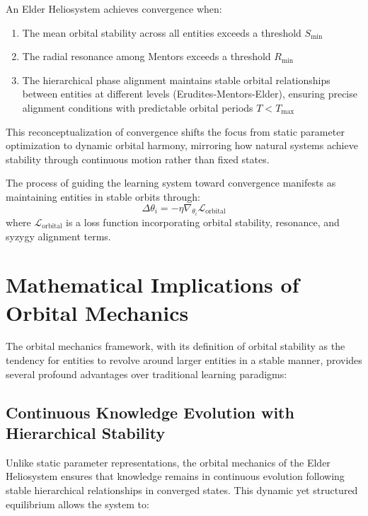 \begin{theorem}
An Elder Heliosystem achieves convergence when:
\begin{enumerate}
    \item The mean orbital stability across all entities exceeds a threshold $S_{\text{min}}$
    \item The radial resonance among Mentors exceeds a threshold $R_{\text{min}}$
    \item The hierarchical phase alignment maintains stable orbital relationships between entities at different levels (Erudites-Mentors-Elder), ensuring precise alignment conditions with predictable orbital periods $T < T_{\text{max}}$
\end{enumerate}
\end{theorem}

This reconceptualization of convergence shifts the focus from static parameter optimization to dynamic orbital harmony, mirroring how natural systems achieve stability through continuous motion rather than fixed states.

\begin{proposition}
The process of guiding the learning system toward convergence manifests as maintaining entities in stable orbits through:
\begin{equation}
\Delta\theta_i = -\eta \nabla_{\theta_i} \mathcal{L}_{\text{orbital}}
\end{equation}
where $\mathcal{L}_{\text{orbital}}$ is a loss function incorporating orbital stability, resonance, and syzygy alignment terms.
\end{proposition}

\section{Mathematical Implications of Orbital Mechanics}

The orbital mechanics framework, with its definition of orbital stability as the tendency for entities to revolve around larger entities in a stable manner, provides several profound advantages over traditional learning paradigms:

\subsection{Continuous Knowledge Evolution with Hierarchical Stability}

Unlike static parameter representations, the orbital mechanics of the Elder Heliosystem ensures that knowledge remains in continuous evolution following stable hierarchical relationships in converged states. This dynamic yet structured equilibrium allows the system to:

